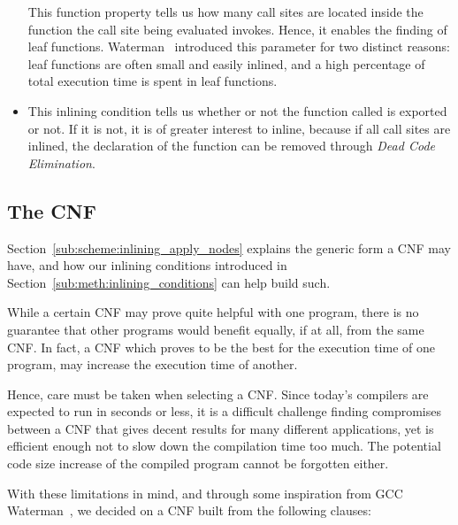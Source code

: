 \begin{itemize}
This function property tells us how many call sites are located inside the
function the call site being evaluated invokes. Hence, it enables the finding of
leaf functions. Waterman~\cite{AdaptvCompilAndInlingWaterman} introduced this
parameter for two distinct reasons: leaf functions are often small and easily
inlined, and a high percentage of total execution time is spent in leaf
functions.

	\item {}

This inlining condition tells us whether or not the function called is exported
or not. If it is not, it is of greater interest to inline, because if all call
sites are inlined, the declaration of the function can be removed through
\textit{Dead Code Elimination}.

\end{itemize}

\subsection{The CNF}
\label{sub:meth:cnf}

Section~\ref{sub:scheme:inlining_apply_nodes} explains the generic form a CNF
may have, and how our inlining conditions introduced in
Section~\ref{sub:meth:inlining_conditions} can help build such.

While a certain CNF may prove quite helpful with one program, there is no
guarantee that other programs would benefit equally, if at all, from the same
CNF. In fact, a CNF which proves to be the best for the execution time of one
program, may increase the execution time of another.

Hence, care must be taken when selecting a CNF. Since today's compilers are
expected to run in seconds or less, it is a difficult challenge finding
compromises between a CNF that gives decent results for many different
applications, yet is efficient enough not to slow down the compilation time too
much. The potential code size increase of the compiled program cannot be
forgotten either.

With these limitations in mind, and through some inspiration from GCC
Waterman~\cite{AdaptvCompilAndInlingWaterman}, we decided on a CNF built from
the following clauses:

